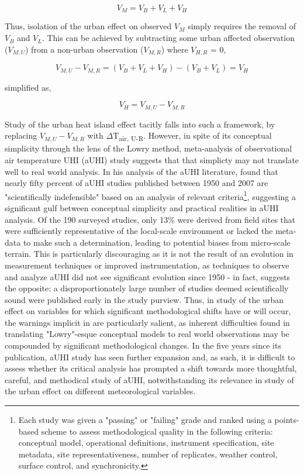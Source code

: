 \begin{equation}
	V_M = V_B + V_L + V_H
\end{equation}

Thus, isolation of the urban effect on observed $V_M$ simply requires the removal of $V_B$ and $V_L$. This can be achieved by subtracting some urban affected observation ($V_{M, U}$) from a non-urban observation ($V_{M, R}$) where $V_{H, R}$ = 0,

\begin{equation}
V_{M, U} - V_{M, R} = (V_B + V_L + V_H) - (V_B + V_L) = V_H
\end{equation}

\noindent simplified as,

\begin{equation}
	V_H = V_{M, U} - V_{M, R}
\end{equation}

Study of the urban heat island effect tacitly falls into such a framework, by replacing $V_{M, U} - V_{M, R}$ with $\Delta$T\textsubscript{air, U-R}. However, in spite of its conceptual simplicity through the lens of the Lowry method, meta-analysis of observational air temperature UHI (aUHI) study suggests that that simplicty may not translate well to real world analysis. In his analysis of the aUHI literature, \citet{Stewart2011} found that nearly fifty percent of aUHI studies published between 1950 and 2007 are "scientifically indefensible" based on an analysis of relevant criteria\footnote{Each study was given a "passing" or "failing" grade and ranked using a points-based scheme to assess methodological quality in the following criteria: conceptual model, operational definitions, instrument specification, site metadata, site representativeness, number of replicates, weather control, surface control, and synchronicity.}, suggesting a significant gulf between conceptual simplicity and practical realities in aUHI analysis. Of the 190 surveyed studies, only 13\% were derived from field sites that were sufficiently representative of the local-scale environment or lacked the meta-data to make such a determination, leading to potential biases from micro-scale terrain. This is particularly discouraging as it is not the result of an evolution in measurement techniques or improved instrumentation, as techniques to observe and analyze aUHI did not see significant evolution since 1950 - in fact, \citet{Stewart2011} suggests the opposite: a disproportionately large number of studies deemed scientifically sound were published early in the study purview. Thus, in study of the urban effect on variables for which significant methodological shifts have or will occur, the warnings implicit in \citet{Stewart2011} are particularly salient, as inherent difficulties found in translating "Lowry"-esque conceptual models to real world observations may be compounded by significant methodological changes. In the five years since its publication, aUHI study has seen further expansion and, as such, it is difficult to assess whether its critical analysis has prompted a shift towards more thoughtful, careful, and methodical study of aUHI, notwithstanding its relevance in study of the urban effect on different meteorological variables.

